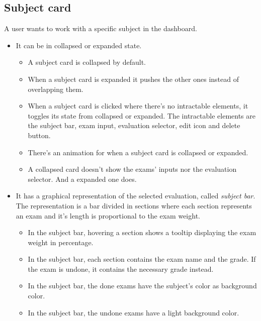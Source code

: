 \subsection*{Subject card}
A user wants to work with a specific subject in the dashboard.

\begin{itemize}[leftmargin=2cm]
    \item[\nextTask{}\label{req:x}] It can be in collapsed or expanded state.
    \begin{itemize}[leftmargin=2cm]
        \item[\nextTask{}\label{req:x}] A subject card is collapsed by default.
        \item[\nextTask{}\label{req:x}] When a subject card is expanded it pushes the other ones instead of overlapping them.
        \item[\nextTask{}\label{req:x}] When a subject card is clicked where there's no intractable elements, it toggles its state from collapsed or expanded. The intractable elements are the subject bar, exam input, evaluation selector, edit icon and delete button.
        \item[\nextTask{}\label{req:x}] There's an animation for when a subject card is collapsed or expanded.
        \item[\nextTask{}\label{req:x}] A collapsed card doesn't show the exams' inputs nor the evaluation selector. And a expanded one does. 
    \end{itemize}
    \item[\nextTask{}\label{req:x}] It has a graphical representation of the selected evaluation, called \textit{subject bar}. The representation is a bar divided in sections where each section represents an exam and it's length is proportional to the exam weight.
    \begin{itemize}[leftmargin=2cm]
        \item[\nextTask{}\label{req:x}] In the subject bar, hovering a section shows a tooltip displaying the exam weight in percentage.
        \item[\nextTask{}\label{req:x}] In the subject bar, each section contains the exam name and the grade. If the exam is undone, it contains the necessary grade instead.
        \item[\nextTask{}\label{req:x}] In the subject bar, the done exams have the subject's color as background color.
        \item[\nextTask{}\label{req:x}] In the subject bar, the undone exams have a light background color.

\end{itemize}
\end{itemize}
